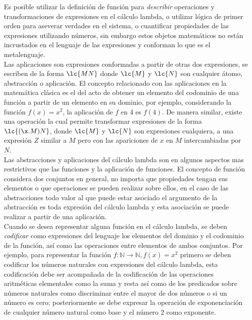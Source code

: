 Es posible utilizar la definición de función para \emph{describir} operaciones y
transformaciones de expresiones en el cálculo lambda, o utilizar lógica de
primer orden para aseverar verdades en el sistema, o cuantificar propiedades de
las expresiones utilizando números, sin embargo estos objetos matemáticos  no
están incrustados en el lenguaje de las expresiones y conforman lo que es el
metalenguaje. \\

Las aplicaciones son expresiones conformadas a partir de otras dos expresiones,
se escriben de la forma \(\lc{M N}\) donde \(\lc{M}\) y \(\lc{N}\) son cualquier
átomo, abstracción o aplicación. El concepto relacionado con las aplicaciones en
la matemática clásica es el del acto de obtener un elemento del codominio de una
función a partir de un elemento en su dominio, por ejemplo, considerando la
función \(f(x)=x^{2}\), la aplicación de \(f\) en 4 es \(f(4)\). De manera
similar, existe una operación la cual permite transformar expresiones de la
forma \(\lc{(\x.M)N}\), donde \(\lc{M}\) y \(\lc{N}\) son expresiones
cualquiera, a una expresión \(Z\) similar a \(M\) pero con las apariciones de
\(x\) en \(M\) intercambiadas por \(N\). \\

Las abstracciones y aplicaciones del cálculo lambda son en algunos aspectos mas
restrictivos que las funciones y la aplicación de funciones. El concepto de
función considera dos conjuntos en general, no importa que propiedades tengan
sus elementos o que operaciones se pueden realizar sobre ellos, en el caso de
las abstracciones todo valor al que puede estar asociado el argumento de la
abstracción es toda expresión del cálculo lambda y esta asociación se
puede realizar a partir de una aplicación. \\

Cuando se desea representar alguna función en el cálculo lambda, se deben
\emph{codificar} como expresiones del lenguaje los elementos del dominio y el
codominio de la función, así como las operaciones entre elementos de ambos
conjuntos. Por ejemplo, para representar la función \(f : \mathbb{N} \to
\mathbb{N}, f(x)=x^{2}\) primero se deben codificar los números naturales con
expresiones del cálculo lambda, esta codificación debe ser acompañada de la
codificación de las operaciones aritméticas elementales como la suma y resta así
como de los predicados sobre números naturales como discriminar entre el mayor
de dos números o si un número es cero; posteriormente se debe expresar la
operación de exponenciación de cualquier número natural como base y el número 2
como exponente. \\

